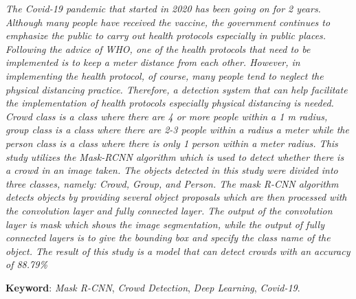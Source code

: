 \begin{spacing}{1}
	
\textit{
  The Covid-19 pandemic that started in 2020 has been going on for 2 years. Although many people have received the vaccine, the government continues to emphasize the public to carry out health protocols especially in public places. Following the advice of WHO, one of the health protocols that need to be implemented is to keep a meter distance from each other. However, in implementing the health protocol, of course, many people tend to neglect the physical distancing practice. Therefore, a detection system that can help facilitate the implementation of health protocols especially physical distancing is needed. Crowd class is a class where there are 4 or more people within a 1 m radius, group class is a class where there are 2-3 people within a radius a meter while the person class is a class where there is only 1 person within a meter radius. This study utilizes the Mask-RCNN algorithm which is used to detect whether there is a crowd in an image taken. The objects detected in this study were divided into three classes, namely: Crowd, Group, and Person. The mask R-CNN algorithm detects objects by providing several object proposals which are then processed with the convolution layer and \emph{fully connected layer}. The output of the convolution layer is \emph{mask} which shows the image segmentation, while the output of \emph{fully connected layers} is to give the \emph{bounding box} and specify the class name of the object. The result of this study is a model that can detect crowds with an accuracy of 88.79\%
}

\vspace{2ex}
\textbf{Keyword}: \emph{Mask R-CNN}, \emph{Crowd Detection}, \emph{Deep Learning}, \emph{Covid-19}.
\end{spacing}